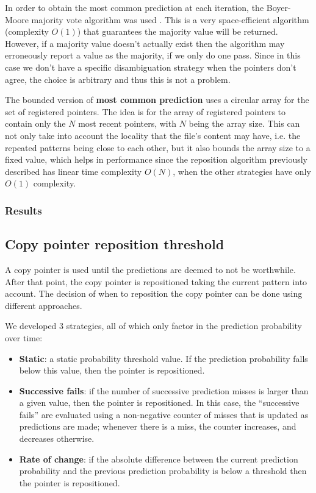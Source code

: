 \documentclass{article}
\begin{document}
In order to obtain the most common prediction at each iteration, the Boyer-Moore majority vote algorithm was used \cite{majority}.
This is a very space-efficient algorithm (complexity $O(1)$) that guarantees the majority value will be returned.
However, if a majority value doesn't actually exist then the algorithm may erroneously report a value as the majority, if we only do one pass.
Since in this case we don't have a specific disambiguation strategy when the pointers don't agree, the choice is arbitrary and thus this is not a problem.

The bounded version of \textbf{most common prediction} uses a circular array for the set of registered pointers.
The idea is for the array of registered pointers to contain only the $N$ most recent pointers, with $N$ being the array size.
This can not only take into account the locality that the file's content may have, i.e. the repeated patterns being close to each other, but it also bounds the array size to a fixed value, which helps in performance since the reposition algorithm previously described has linear time complexity $O(N)$, when the other strategies have only $O(1)$ complexity.

\subsubsection{Results}

\subsection{Copy pointer reposition threshold}

A copy pointer is used until the predictions are deemed to not be worthwhile.
After that point, the copy pointer is repositioned taking the current pattern into account.
The decision of when to reposition the copy pointer can be done using different approaches.

We developed 3 strategies, all of which only factor in the prediction probability over time:
\begin{itemize}
    \item \textbf{Static}: a static probability threshold value. If the prediction probability falls below this value, then the pointer is repositioned.
    \item \textbf{Successive fails}: if the number of successive prediction misses is larger than a given value, then the pointer is repositioned.
    In this case, the ``successive fails'' are evaluated using a non-negative counter of misses that is updated as predictions are made; whenever there is a miss, the counter increases, and decreases otherwise.
    \item \textbf{Rate of change}: if the absolute difference between the current prediction probability and the previous prediction probability is below a threshold then the pointer is repositioned.
\end{itemize}
\end{document}
